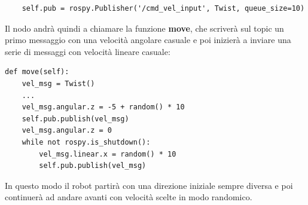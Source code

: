 \documentclass[Lau, binding=0.6cm, oneside]{sapthesis}
\begin{document}
\begin{lstlisting}
    self.pub = rospy.Publisher('/cmd_vel_input', Twist, queue_size=10)
\end{lstlisting}

Il nodo andrà quindi a chiamare la funzione \textbf{move}, che scriverà sul topic un primo messaggio con una velocità angolare casuale e poi inizierà a inviare una serie di messaggi con velocità lineare casuale:

\begin{lstlisting}
def move(self):
    vel_msg = Twist()
    ...
    vel_msg.angular.z = -5 + random() * 10
    self.pub.publish(vel_msg)
    vel_msg.angular.z = 0
    while not rospy.is_shutdown():
        vel_msg.linear.x = random() * 10
        self.pub.publish(vel_msg)
\end{lstlisting}
In questo modo il robot partirà con una direzione iniziale sempre diversa e poi continuerà ad andare avanti con velocità scelte in modo randomico.
\end{document}
